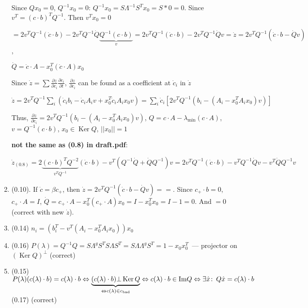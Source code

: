 \documentclass[a4paper]{article}
\DeclareMathOperator{\Ker}{Ker}
\begin{document}
\begin{enumerate}
Since $Qx_0=0$, $Q^{-1}x_0=0$: $Q^{-1}x_0=S\Lambda^{-1}S^Tx_0=S*0=0$. Since $v^T=(c\cdot b)^TQ^{-1}$. Then $v^Tx_0=0$

$\boxed{=}2v^TQ^{-1}(\dot{c}\cdot b)-2v^TQ^{-1}\dot{Q}\underbrace{Q^{-1}(c\cdot b)}_v=2v^TQ^{-1}(\dot{c}\cdot b)-2v^TQ^{-1}\dot{Q}v=\boxed{\dot{z}=2v^TQ^{-1}(\dot{c}\cdot b-\dot{Q}v)}$,

$\dot{Q}=\dot{c}\cdot A-x_0^T(\dot{c}\cdot A)x_0$

Since $\dot{z}=\sum \frac{\partial z}{\partial c_i}\frac{\partial c_i}{\partial t}$, $\frac{\partial z}{\partial c_i}$ can be found as a coefficient at $\dot{c}_i$ in $\dot{z}$

$\dot{z}=2v^TQ^{-1}\sum\limits_i\left(\dot{c}_ib_i-\dot{c}_iA_iv+x_0^T\dot{c}_iA_ix_0v\right)=\sum\limits_i \dot{c}_i\left[2v^TQ^{-1}(b_i-(A_i-x_0^TA_ix_0)v)\right]$

Thus, $\boxed{\frac{\partial z}{\partial c_i}=2v^TQ^{-1}(b_i-(A_i-x_0^TA_ix_0)v)}$, $Q=c\cdot A-\lambda_{\min}(c\cdot A)$, $v=Q^{-1}(c\cdot b)$, $x_0\in\Ker Q$, $||x_0||=1$

{\bf not the same as (0.8) in draft.pdf}:

$\dot{z}_{(0.8)}=2\underbrace{(c\cdot b)^TQ^{-2}}_{v^TQ^{-1}}(\dot{c}\cdot b)-v^T(Q^{-1}\dot{Q}+\dot{Q}Q^{-1})v=2v^TQ^{-1}(\dot{c}\cdot b)-v^TQ^{-1}\dot{Q}v-v^T\dot{Q}Q^{-1}v$
\item (0.10). If $\dot{c}=\beta c_+$, then $\dot{z}=2v^TQ^{-1}(\dot{c}\cdot b-\dot{Q}v)=\boxed{=}$. Since $c_+\cdot b=0$, $c_+\cdot A=I$, $\dot{Q}=c_+\cdot A-x_0^T(c_+\cdot A)x_0=I-x_0^Tx_0=I-1=0$. And $\boxed{=}0$ (correct with new $\dot{z}$).
\item (0.14) $n_i=\left(b_i^T-v^T(A_i-x_0^TA_ix_0)\right)x_0$
\item (0.16) $P(\lambda)=Q^{-1}Q=S\Lambda^gS^TS\Lambda S^T=S\Lambda\Lambda^g S^T=1-x_0x_0^T$~--- projector on $(\Ker Q)^\bot$ (correct)
\item (0.15) $P(\lambda)(c(\lambda)\cdot b)=c(\lambda)\cdot b\Leftrightarrow \underbrace{(c(\lambda)\cdot b)\bot \Ker Q}_{\Leftrightarrow c(\lambda)\in c_{\mbox{\tiny bad}}}\Leftrightarrow c(\lambda)\cdot b\in\mbox{Im}Q\Leftrightarrow \exists \hat{x}\colon\, Q\hat{x}=c(\lambda)\cdot b$ (0.17) (correct)
\end{enumerate}
\end{document}
